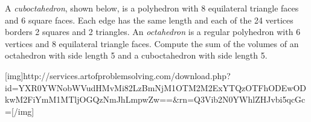 A \emph{cuboctahedron}, shown below, is a polyhedron with 8 equilateral triangle faces and 6 square faces. Each edge has the same length and each of the 24 vertices borders 2 squares and 2 triangles. An \emph{octahedron} is a regular polyhedron with 6 vertices and 8 equilateral triangle faces. Compute the sum of the volumes of an octahedron with side length 5 and a cuboctahedron with side length 5.

[img]http://services.artofproblemsolving.com/download.php?id=YXR0YWNobWVudHMvMi82LzBmNjM1OTM2M2ExYTQzOTFhODEwODkwM2FiYmM1MTljOGQzNmJhLmpwZw==&rn=Q3Vib2N0YWhlZHJvbi5qcGc=[/img]